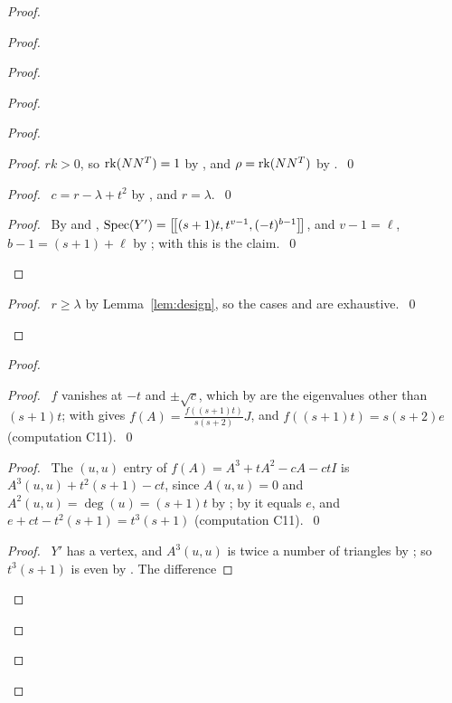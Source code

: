 \begin{proof}
\begin{proof}
\begin{proof}
\begin{proof}
\begin{proof}
\begin{proof}
      $rk>0$, so $\mathop{\mathrm{rk}}\nolimits(NN^T)=1$ by , and $\rho=\mathop{\mathrm{rk}}\nolimits(NN^T)$ by
      .~\qed\end{proof}
     \begin{proof}\pf\ $c=r-\lambda+t^2$ by , and $r=\lambda$.~\qed\end{proof}
     \qedstep
     \begin{proof}\pf\ By  and ,
      $\mathop{\mathrm{Spec}}\nolimits(Y')=\left[\!\left[(s+1)t,t^{v-1},(-t)^{b-1}\right]\!\right]$, and $v-1=\ell$, $b-1=(s+1)+\ell$ by
      ; with  this is the claim.~\qed\end{proof}
    \end{proof}
    \qedstep
    \begin{proof}\pf\ $r\ge\lambda$ by Lemma~\ref{lem:design}, so the cases
      and  are exhaustive.~\qed\end{proof}
   \end{proof}
   \begin{proof}
    \begin{proof}\pf\ $f$ vanishes at $-t$ and $\pm\sqrt c$, which by  are
     the eigenvalues other than $(s+1)t$;  with  gives
     $f(A)=\frac{f((s+1)t)}{s(s+2)}J$, and $f((s+1)t)=s(s+2)e$ (computation C11).~\qed\end{proof}
    \begin{proof}\pf\ The $(u,u)$ entry of $f(A)=A^3+tA^2-cA-ctI$ is
     $A^3(u,u)+t^2(s+1)-ct$, since $A(u,u)=0$ and $A^2(u,u)=\deg(u)=(s+1)t$ by
     ;
     by  it equals $e$, and $e+ct-t^2(s+1)=t^3(s+1)$ (computation
     C11).~\qed\end{proof}
    \qedstep
    \begin{proof}\pf\ $Y'$ has a vertex, and $A^3(u,u)$ is twice a number of triangles by
     ; so $t^3(s+1)$ is even by . The difference

\end{proof}
\end{proof}
\end{proof}
\end{proof}
\end{proof}
